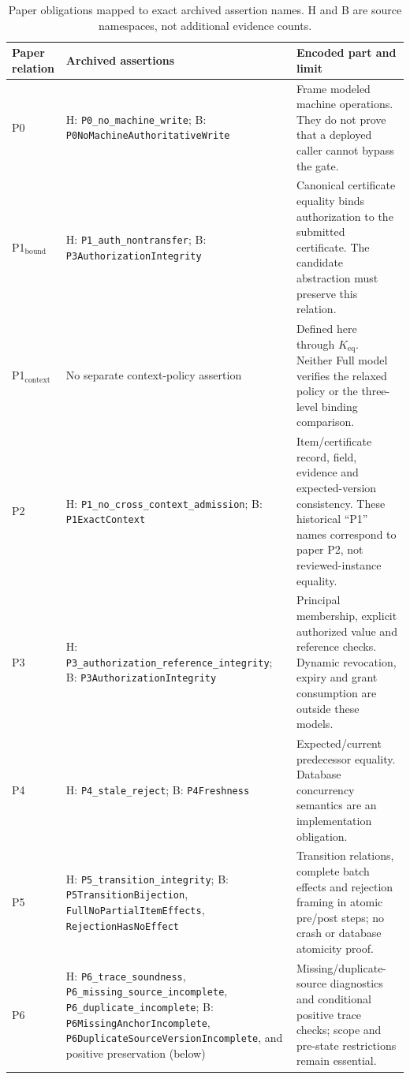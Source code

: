 \begin{table}[htbp]
\centering\footnotesize
\caption{Paper obligations mapped to exact archived assertion names. \textsf{H}
and \textsf{B} are source namespaces, not additional evidence counts.}
\label{tab:formal-contract-map}
\begin{tabularx}{\textwidth}{@{}>{\raggedright\arraybackslash}p{}>{\raggedright\arraybackslash}p{}>{\raggedright\arraybackslash}X@{}}
\toprule
Paper relation & Archived assertions & Encoded part and limit\\
\midrule
P0 & \textsf{H}: \nolinkurl{P0_no_machine_write}; \textsf{B}: \nolinkurl{P0NoMachineAuthoritativeWrite}
& Frame modeled machine operations. They do not prove that a deployed caller cannot bypass the gate.\\
P1$_{\mathrm{bound}}$ & \textsf{H}: \nolinkurl{P1_auth_nontransfer}; \textsf{B}: \nolinkurl{P3AuthorizationIntegrity}
& Canonical certificate equality binds authorization to the submitted certificate. The candidate abstraction must preserve this relation.\\
P1$_{\mathrm{context}}$ & No separate context-policy assertion
& Defined here through $K_{\mathrm{eq}}$. Neither Full model verifies the relaxed policy or the three-level binding comparison.\\
P2 & \textsf{H}: \nolinkurl{P1_no_cross_context_admission}; \textsf{B}: \nolinkurl{P1ExactContext}
& Item/certificate record, field, evidence and expected-version consistency. These historical ``P1'' names correspond to paper P2, not reviewed-instance equality.\\
P3 & \textsf{H}: \nolinkurl{P3_authorization_reference_integrity}; \textsf{B}: \nolinkurl{P3AuthorizationIntegrity}
& Principal membership, explicit authorized value and reference checks. Dynamic revocation, expiry and grant consumption are outside these models.\\
P4 & \textsf{H}: \nolinkurl{P4_stale_reject}; \textsf{B}: \nolinkurl{P4Freshness}
& Expected/current predecessor equality. Database concurrency semantics are an implementation obligation.\\
P5 & \textsf{H}: \nolinkurl{P5_transition_integrity}; \textsf{B}: \nolinkurl{P5TransitionBijection}, \nolinkurl{FullNoPartialItemEffects}, \nolinkurl{RejectionHasNoEffect}
& Transition relations, complete batch effects and rejection framing in atomic pre/post steps; no crash or database atomicity proof.\\
P6 & \textsf{H}: \nolinkurl{P6_trace_soundness}, \nolinkurl{P6_missing_source_incomplete}, \nolinkurl{P6_duplicate_incomplete}; \textsf{B}: \nolinkurl{P6MissingAnchorIncomplete}, \nolinkurl{P6DuplicateSourceVersionIncomplete}, and positive preservation (below)
& Missing/duplicate-source diagnostics and conditional positive trace checks; scope and pre-state restrictions remain essential.\\
\bottomrule
\end{tabularx}
\end{table}

